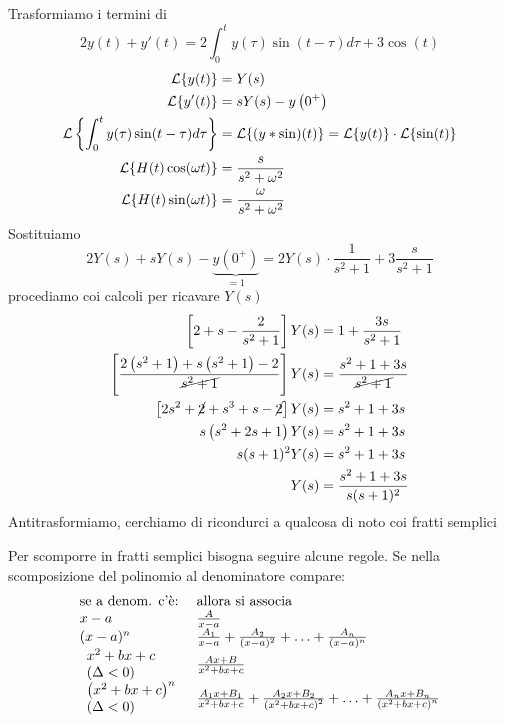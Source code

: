 Trasformiamo i termini di
\begin{equation*}
2y(t) + y'(t) = 2\int ^{t}_{0} y(\tau)\sin(t - \tau) d\tau + 3\cos(t)
\end{equation*}
\begin{align*}
\mathcal{L}\{y(t)\} & = Y(s)\\
\mathcal{L}\{y'(t)\} & = sY(s) - y\left(0^{ + }\right)\\
\mathcal{L}\left\{\int ^{t}_{0} y(\tau)\sin(t - \tau) d\tau \right\} & = \mathcal{L}\{(y*\sin)(t)\} = \mathcal{L}\{y(t)\} \cdot \mathcal{L}\{\sin(t)\}\\
\mathcal{L}\{H(t)\cos(\omega t)\} & = \frac{s}{s^{2} + \omega ^{2}}\\
\mathcal{L}\{H(t)\sin(\omega t)\} & = \frac{\omega }{s^{2} + \omega ^{2}}
\end{align*}
Sostituiamo
\begin{equation*}
2Y(s) + sY(s) - \underbrace{y\left(0^{ + }\right)}_{ = 1} = 2Y(s) \cdot \frac{1}{s^{2} + 1} + 3\frac{s}{s^{2} + 1}
\end{equation*}
procediamo coi calcoli per ricavare $Y(s)$
\begin{align*}
\left[ 2 + s - \frac{2}{s^{2} + 1}\right] Y(s) & = 1 + \frac{3s}{s^{2} + 1}\\
\left[\frac{2\left(s^{2} + 1\right) + s\left(s^{2} + 1\right) - 2}{\cancel{s^{2} + 1}}\right] Y(s) & = \frac{s^{2} + 1 + 3s}{\cancel{s^{2} + 1}}\\
\left[ 2s^{2} + \cancel{2} + s^{3} + s - \cancel{2}\right] Y(s) & = s^{2} + 1 + 3s\\
s\left(s^{2} + 2s + 1\right) Y(s) & = s^{2} + 1 + 3s\\
s(s + 1)^{2} Y(s) & = s^{2} + 1 + 3s\\
Y(s) & = \frac{s^{2} + 1 + 3s}{s(s + 1)^{2}}
\end{align*}
Antitrasformiamo, cerchiamo di ricondurci a qualcosa di noto coi fratti semplici
\begin{rem}
Per scomporre in fratti semplici bisogna seguire alcune regole. Se nella scomposizione del polinomio al denominatore compare:
\begin{equation*}
\begin{array}{ l l }
\text{se a denom. c'è:} & \text{allora si associa}\\
x - a & \frac{A}{x - a}\\
(x - a)^{n} & \frac{A_{1}}{x - a} + \frac{A_{2}}{(x - a)^{2}} + \dotsc + \frac{A_{n}}{(x - a)^{n}}\\
\begin{array}{l}
x^{2} + bx + c\\
(\Delta < 0)
\end{array} & \frac{Ax + B}{x^{2} + bx + c}\\
\begin{array}{l}
\left(x^{2} + bx + c\right)^{n}\\
(\Delta < 0)
\end{array} & \frac{A_{1} x + B_{1}}{x^{2} + bx + c} + \frac{A_{2} x + B_{2}}{\left(x^{2} + bx + c\right)^{2}} + \dotsc + \frac{A_{n} x + B_{n}}{\left(x^{2} + bx + c\right)^{n}}
\end{array}
\end{equation*}
\end{rem}
